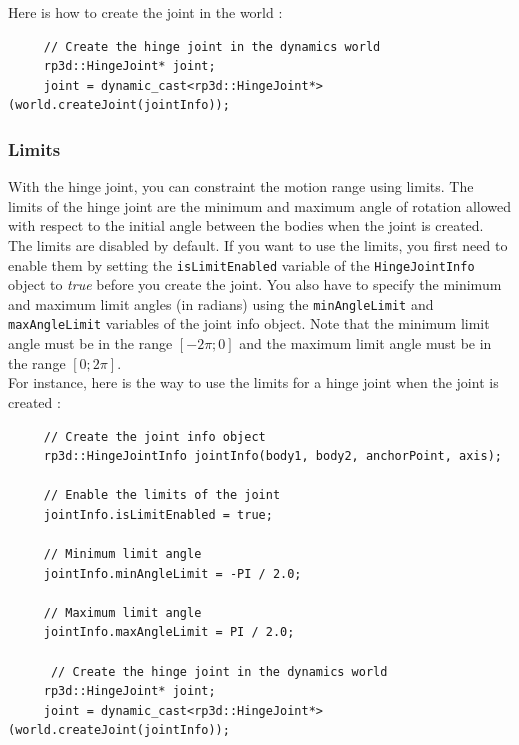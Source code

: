 \documentclass[a4paper,12pt]{article}
\begin{document}
    Here is how to create the joint in the world : \\

    \begin{lstlisting}
     // Create the hinge joint in the dynamics world
     rp3d::HingeJoint* joint;
     joint = dynamic_cast<rp3d::HingeJoint*>(world.createJoint(jointInfo));
  \end{lstlisting}

     \subsubsection{Limits}

     With the hinge joint, you can constraint the motion range using limits. The limits of the hinge joint are the minimum and maximum angle of rotation allowed with respect to the initial
     angle between the bodies when the joint is created. The limits are disabled by default. If you want to use the limits, you first need to enable them by setting the
     \texttt{isLimitEnabled} variable of the \texttt{HingeJointInfo} object to \emph{true} before you create the joint. You also have to specify the minimum and maximum limit
     angles (in radians) using the \texttt{minAngleLimit} and \texttt{maxAngleLimit} variables of the joint info object. Note that the minimum limit angle must be in the
     range $[ -2 \pi; 0 ]$ and the maximum limit angle must be in the range $[ 0; 2 \pi ]$. \\

     For instance, here is the way to use the limits for a hinge joint when the joint is created : \\

     \begin{lstlisting}
     // Create the joint info object
     rp3d::HingeJointInfo jointInfo(body1, body2, anchorPoint, axis);

     // Enable the limits of the joint
     jointInfo.isLimitEnabled = true;

     // Minimum limit angle
     jointInfo.minAngleLimit = -PI / 2.0;

     // Maximum limit angle
     jointInfo.maxAngleLimit = PI / 2.0;

      // Create the hinge joint in the dynamics world
     rp3d::HingeJoint* joint;
     joint = dynamic_cast<rp3d::HingeJoint*>(world.createJoint(jointInfo));
  \end{lstlisting}

     \vspace{0.6cm}
\end{document}
